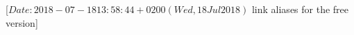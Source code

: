 %
%
%
%
%
%
%
%
% 
%
%

                 [$Date: 2018-07-18 13:58:44 +0200 (Wed, 18 Jul 2018) $
                  link aliases for the free version]

\makeatletter
\newcommand*{\lalias}[3][]{%
  \scr@ifundefinedorrelax{r@#3}{%
    \ClassWarning{scrguide}{%
      Label alias `#2'\MessageBreak
      to `#3' ignored,\MessageBreak
      because `#3' undefined%
    }%
  }{%
    \scr@ifundefinedorrelax{r@#2}{%
      \IfArgIsEmpty{#1}{%
        \expandafter\let\csname r@#2\expandafter\endcsname
        \csname r@#3\endcsname
      }{%
        \expandafter\let\expandafter\reserved@a\csname r@#3\endcsname
        \expandafter\expandafter\expandafter\def
        \expandafter\expandafter\expandafter\reserved@a
        \expandafter\expandafter\expandafter{\expandafter\@gobble\reserved@a}%
        \expandafter\edef\csname r@#2\endcsname{%
          {\unexpanded{#1}}\unexpanded\expandafter{\reserved@a}%
        }%
      }%
    }{%
      \ClassWarning{scrguide}{%
        Label alias `#2'\MessageBreak
        to `#3' ignored,\MessageBreak
        because of multiply definition%
      }%
      \gdef \@multiplelabels {%
        \@latex@warning@no@line{There were multiply-defined labels}}%
    }%
  }%
}
\makeatother

